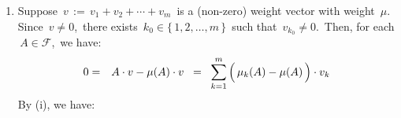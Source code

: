 \begin{enumerate}
\begin{eqnarray*}
    \cdots
    \,+\,
    \left(\,\mu_{m}(A) \overset{{\color{white}.}}{-} \mu_{2}(A)\,\right)\!\cdot v_{m}
    \\
    & = &
    \left(\,\mu_{1}(A) \overset{{\color{white}.}}{-} \mu_{2}(A)\,\right)\!\cdot v_{1}
    \,+\,
    \left(\,\mu_{3}(A) \overset{{\color{white}.}}{-} \mu_{2}(A)\,\right)\!\cdot v_{3}
    \,+\,
    \cdots
    \,+\,
    \left(\,\mu_{m}(A) \overset{{\color{white}.}}{-} \mu_{2}(A)\,\right)\!\cdot v_{m}
    \end{eqnarray*}
    By the induction hypothesis, we have:
    \,$\left(\,\mu_{k}(A) \overset{{\color{white}.}}{-} \mu_{2}(A)\,\right)\cdot v_{k} \,=\, 0$,\,
    for each \,$k \in \{1,3,\ldots,m\}$.\,
    In particular, we have:
    \,$\left(\,\mu_{1}(A) \overset{{\color{white}.}}{-} \mu_{2}(A)\,\right) \cdot v_{1} \,=\, 0$.\,
    This in turn implies \,$v_{1} \,=\, 0$\,
    (since \,$\mu_{1}(A) \neq \mu_{2}(A)$\, by choice of \,$A \in \mathcal{F}$).
    This completes the proof of Claim 1.
    \vskip 0.2cm
    \noindent
    \textbf{Claim 2:}\;\; $v_{2} = v_{3} = v_{m} = 0$
    \vskip -0.1cm
    Proof of Claim 2:\; Simply observe that
    \begin{equation*}
    \left.\begin{array}{c}
    v_{1} + v_{2} + \cdots + v_{m} \,=\, 0\,,
    \\
    \overset{{\color{white}.}}{\textnormal{Claim 1 (i.e., \,$v_{1} \,=\, 0$),\, and}}
    \\
    \overset{{\color{white}.}}{\textnormal{induction hypothesis}}
    \end{array}\;\right\}
    \!\!\Longrightarrow\;\;
    \,v_{2} = v_{3} = \cdots = v_{m} = 0
    \end{equation*}
    This proves Claim 2.
    \vskip 0.2cm
    \noindent
    The induction step now follows immediately by Claim 1 and Claim 2, as required.
\item
    Suppose \,$v \,:=\, v_{1} + v_{2} + \cdots + v_{m}$\, is a (non-zero) weight vector
    with weight \,$\mu$.\,
    Since \,$v \neq 0$,\, there exists \,$k_{0} \in \{\,1,2,\ldots,m\,\}$\,
    such that \,$v_{k_{0}} \neq 0$.\,
    Then, for each \,$A \in \mathcal{F}$,\, we have:
    \begin{eqnarray*}
    0
    & = &
        A \cdot v - \mu(A) \cdot v
    \;\; = \;\;
        \overset{m}{\underset{k=1}{\sum}}
        \left(\,
            \mu_{k}(A) \overset{{\color{white}.}}{-} \mu(A)
            \,\right)
        \cdot
        v_{k}
    \end{eqnarray*}
    By (i), we have:

\end{enumerate}
